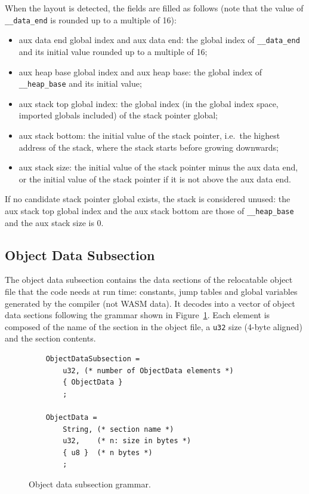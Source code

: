 \documentclass{article}
\begin{document}
When the layout is detected, the fields are filled as follows (note that the value of \verb|__data_end| is rounded up to a multiple of 16):
\begin{itemize}
\item aux data end global index and aux data end: the global index of \verb|__data_end| and its initial value rounded up to a multiple of 16;
\item aux heap base global index and aux heap base: the global index of \verb|__heap_base| and its initial value;
\item aux stack top global index: the global index (in the global index space, imported globals included) of the stack pointer global;
\item aux stack bottom: the initial value of the stack pointer, i.e.\ the highest address of the stack, where the stack starts before growing downwards;
\item aux stack size: the initial value of the stack pointer minus the aux data end, or the initial value of the stack pointer if it is not above the aux data end.
\end{itemize}
If no candidate stack pointer global exists, the stack is considered unused: the aux stack top global index and the aux stack bottom are those of \verb|__heap_base| and the aux stack size is 0.

\subsection{Object Data Subsection}
\label{sec:object-data}
The object data subsection contains the data sections of the relocatable object file that the code needs at run time: constants, jump tables and global variables generated by the compiler (not WASM data).
It decodes into a vector of object data sections following the grammar shown in Figure~\ref{fig:object-data-subsection-grammar}.
Each element is composed of the name of the section in the object file, a \verb|u32| size (4-byte aligned) and the section contents.

\begin{figure}[H]
\begin{verbatim}
    ObjectDataSubsection =
        u32, (* number of ObjectData elements *)
        { ObjectData }
        ;

    ObjectData =
        String, (* section name *)
        u32,    (* n: size in bytes *)
        { u8 }  (* n bytes *)
        ;
\end{verbatim}
\caption{Object data subsection grammar.}
\label{fig:object-data-subsection-grammar}
\end{figure}
\end{document}
